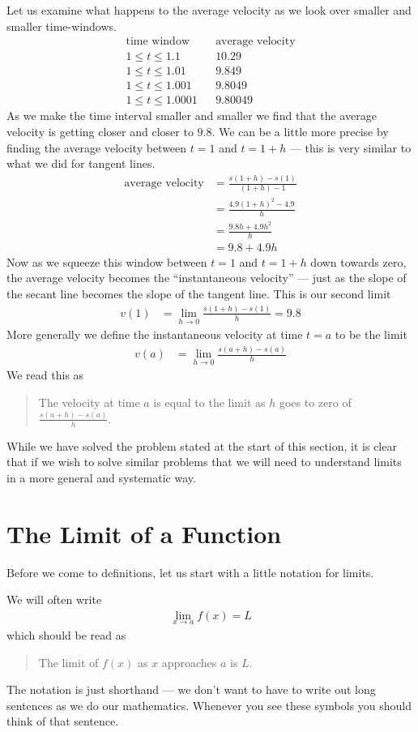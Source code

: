 Let us examine what happens to the average velocity as we look over smaller and
smaller time-windows.
\begin{align*}
  \text{time window} && \text{average velocity}\\
  1 \leq t \leq 1.1 && 10.29 \\
  1 \leq t \leq 1.01 && 9.849 \\
  1 \leq t \leq 1.001 && 9.8049 \\
  1 \leq t \leq 1.0001 && 9.80049
\end{align*}
As we make the time interval smaller and smaller we find that the average
velocity is getting closer and closer to $9.8$. We can be a little more precise
by finding the average velocity between $t=1$ and $t=1+h$ --- this is very
similar to what we did for tangent lines.
\begin{align*}
  \text{average velocity} &= \frac{s(1+h) - s(1)}{(1+h)-1} \\
  &= \frac{4.9(1+h)^2 - 4.9}{h} \\
  &= \frac{9.8h + 4.9h^2}{h} \\
  &= 9.8 + 4.9h
\end{align*}
Now as we squeeze this window between $t=1$ and $t=1+h$ down towards zero, the
average velocity becomes the ``instantaneous velocity'' --- just as the
slope of the secant line becomes the slope of the tangent line. This is
our second limit
\begin{align*}
 v(1) &= \lim_{h \to 0} \frac{s(1+h)-s(1)}{h} = 9.8
\end{align*}
More generally we define the instantaneous velocity at time $t=a$ to be the
limit
\begin{align*}
  v(a) &= \lim_{h \to 0} \frac{ s(a+h) - s(a) }{h}
\end{align*}
We read this as
\begin{quote}
 The velocity at time $a$ is equal to the limit as $h$ goes to zero of
$\frac{s(a+h)-s(a)}{h}$.
\end{quote}

While we have solved the problem stated at the start of this section, it is
clear that if we wish to solve similar problems that we will need to
understand limits in a more general and systematic way.

\section{The Limit of a Function}
\label{sec lim func}

Before we come to definitions, let us start with a little notation for limits.
\begin{notn}
We will often write
\begin{align*}
  \lim_{x \to a} f(x) = L
\end{align*}
which should be read as
\begin{quote}
The limit of $f(x)$ as $x$ approaches $a$ is $L$.
\end{quote}
\end{notn}
The notation is just shorthand --- we don't want to have to write out long
sentences as we do our mathematics. Whenever you see these symbols you
should think of that sentence.

